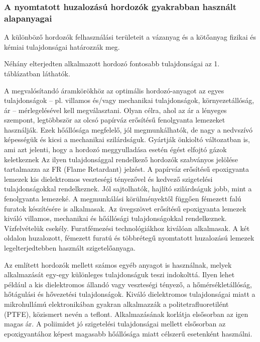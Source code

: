 \documentclass[12pt]{article}
\begin{document}
			
			

		\subsubsection{A nyomtatott huzalozású hordozók gyakrabban használt alapanyagai} A különböző hordozók felhasználási területeit a vázanyag és a kötőanyag fizikai és kémiai tulajdonságai határozzák meg.
		
		Néhány elterjedten alkalmazott hordozó fontosabb tulajdonságai az 1. táblázatban láthatók.




		A megvalósítandó áramkörökhöz az optimális hordozó-anyagot az egyes tulajdonságok – pl. villamos és/vagy mechanikai tulajdonságok, környezetállóság, ár – mérlegelésével kell megválasztani. Olyan célra, ahol az ár a lényeges szempont, legtöbbször az olcsó papírváz erősítésű fenolgyanta lemezeket használják. Ezek hőállósága megfelelő, jól megmunkálhatók, de nagy a nedvszívó képességük és kicsi a mechanikai szilárdságuk. Gyártják önkioltó változatban is, ami azt jelenti, hogy a hordozó meggyulladása esetén égést elfojtó gázok keletkeznek Az ilyen tulajdonsággal rendelkező hordozók szabványos jelölése tartalmazza az FR (Flame Retardant) jelzést. A papírváz erősítésű epoxigyanta lemezek kis dielektromos veszteségi tényezővel és kedvező szigetelési tulajdonságokkal rendelkeznek. Jól sajtolhatók, hajlító szilárdságuk jobb, mint a fenolgyanta lemezeké. A megmunkálási körülményektől függően fémezett falú furatok készítésére is alkalmasak. Az üvegszövet erősítésű epoxigyanta lemezek kiváló villamos, mechanikai és hőállósági tulajdonságokkal rendelkeznek. Vízfelvételük csekély. Furatfémezési technológiákhoz kiválóan alkalmasak. A két oldalon huzalozott, fémezett furatú és többrétegű nyomtatott huzalozású lemezek legelterjedtebben használt szigetelőanyaga.
		
		Az említett hordozók mellett számos egyéb anyagot is használnak, melyek alkalmazását egy-egy különleges tulajdonságuk teszi indokolttá. Ilyen lehet például a kis dielektromos állandó vagy veszteségi tényező, a hőmérsékletállóság, hőtágulási és hővezetési tulajdonságok. Kiváló dielektromos tulajdonságai miatt a mikrohullámú elektronikában gyakran alkalmazzák a politetrafluoretilént (PTFE), közismert nevén a teflont. Alkalmazásának korlátja elsősorban az igen magas ár. A poliimidet jó szigetelési tulajdonságai mellett elsősorban az epoxigyantához képest magasabb hőállósága miatt célszerű esetenként használni.
\end{document}
